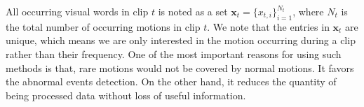 All occurring visual words in clip $t$ is noted as a set $\mathbf{x}_t=\{x_{t,i}\}_{i=1}^{N_t}$, where $N_t$ is the total number of occurring motions in clip $t$. We note that the entries in $\mathbf{x}_t$ are unique, which means  we are only interested in the motion occurring during a clip rather than their frequency. One of the most important reasons for using such methods is that, rare motions would not be covered by normal motions. It favors the abnormal events detection. On the other hand, it reduces the quantity of being processed data without loss of useful information.

%

